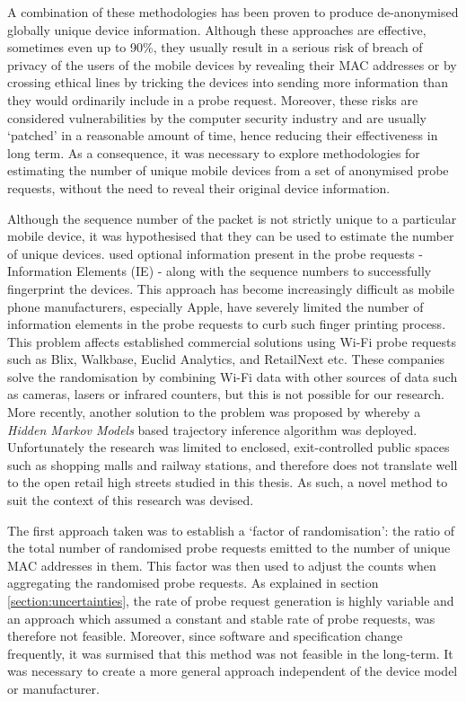 A combination of these methodologies has been proven to produce de-anonymised globally unique device information\cite[-4cm]{vanhoef2016, martin2017}.
Although these approaches are effective, sometimes even up to 90\%, they usually result in a serious risk of breach of privacy of the users of the mobile devices by revealing their MAC addresses or by crossing ethical lines by tricking the devices into sending more information than they would ordinarily include in a probe request.
Moreover, these risks are considered vulnerabilities by the computer security industry and are usually ‘patched’ in a reasonable amount of time, hence reducing their effectiveness in long term.
As a consequence, it was necessary to explore methodologies for estimating the number of unique mobile devices from a set of anonymised probe requests, without the need to reveal their original device information.

Although the sequence number of the packet is not strictly unique to a particular mobile device, it was hypothesised that they can be used to estimate the number of unique devices.
\citet{vanhoef2016} used optional information present in the probe requests - Information Elements (IE) - along with the sequence numbers to successfully fingerprint the devices.
This approach has become increasingly difficult as mobile phone manufacturers, especially Apple, have severely limited the number of information elements in the probe requests to curb such finger printing process.
This problem affects established commercial solutions using Wi-Fi probe requests such as Blix, Walkbase, Euclid Analytics, and RetailNext etc.
These companies solve the randomisation by combining Wi-Fi data with other sources of data such as cameras, lasers or infrared counters, but this is not possible for our research.
More recently, another solution to the problem was  proposed by \citet{hong2018}\cite{hong2018} whereby a \textit{Hidden Markov Models} based trajectory inference algorithm was deployed.
Unfortunately the research was limited to enclosed, exit-controlled public spaces such as shopping malls and railway stations, and therefore does not translate well to the open retail high streets studied in this thesis.
As such, a novel method to suit the context of this research was devised.

The first approach taken was to establish a ‘factor of randomisation’: the ratio of the total number of randomised probe requests emitted  to the number of unique MAC addresses in them.
This factor was then used to adjust the counts when aggregating the randomised probe requests.
As explained in section \ref{section:uncertainties}, the rate of probe request generation is highly variable and an approach which assumed a constant and stable rate of probe requests, was therefore not feasible.
Moreover, since software and specification change frequently, it was surmised that this method was not feasible in the long-term.
It was necessary to create a more general approach independent of the device model or manufacturer.

